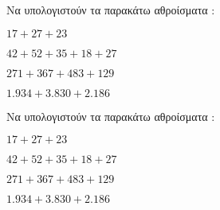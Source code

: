 Να υπολογιστούν τα παρακάτω αθροίσματα :
\begin{rlist}
\item $ 17+27+23 $
\item $ 42+52+35+18+27 $
\item $ 271+367+483+129 $
\item $ 1.934+3.830+2.186 $
\end{rlist}
Να υπολογιστούν τα παρακάτω αθροίσματα :
\begin{rlist}
\item $ 17+27+23 $
\item $ 42+52+35+18+27 $
\item $ 271+367+483+129 $
\item $ 1.934+3.830+2.186 $
\end{rlist}
